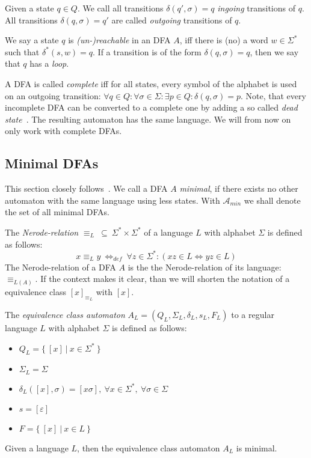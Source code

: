 Given a state $q \in Q$. We call all transitions $\delta(q', \sigma) = q$ \emph{ingoing} transitions of $q$. All transitions $\delta(q, \sigma) = q'$ are called \emph{outgoing} transitions of $q$.

We say a state $q$ is \emph{(un-)reachable} in an DFA $A$, iff there is (no) a word $w \in \Sigma^*$ such that $\delta^*(s, w) = q$. If a transition is of the form $\delta(q, \sigma) = q$, then we say that $q$ has a \emph{loop}.

A DFA is called \emph{complete} iff for all states, every symbol of the alphabet is used on an outgoing transition: $\forall q\in Q\colon \forall\sigma\in\Sigma\colon \exists p\in Q\colon \delta(q,\sigma) = p$. Note, that every incomplete DFA can be converted to a complete one by adding a so called \emph{dead state}~\cite[p. 67]{hopcroft01}. The resulting automaton has the same language. We will from now on only work with complete DFAs.

\subsection{Minimal DFAs}

This section closely follows~\cite[pp. 42-45]{schoening01}. We call a DFA $A$ \emph{minimal}, if there exists no other automaton with the same language using less states. With $\mathcal{A}_{min}$ we shall denote the set of all minimal DFAs.

The \emph{Nerode-relation} $\equiv_L\ \subseteq\ \Sigma^* \times \Sigma^*$ of a language $L$ with alphabet $\Sigma$ is defined as follows:
\begin{displaymath}
	x \equiv_L y\ \Leftrightarrow_{def}\ \forall z\in\Sigma^*\colon (xz\in L \Leftrightarrow yz\in L)
\end{displaymath}
The Nerode-relation of a DFA $A$ is the the Nerode-relation of its language: $\equiv_{L(A)}$. If the context makes it clear, than we will shorten the notation of a equivalence class $[x]_{\equiv_L}$ with $[x]$.

The \emph{equivalence class automaton} $A_L = (Q_L, \Sigma_L, \delta_L, s_L, F_L)$ to a regular language $L$ with alphabet $\Sigma$ is defined as follows:
\begin{itemize}
	\item $Q_L = \{\ [x]\ |\ x \in \Sigma^*\ \}$
	\item $\Sigma_L = \Sigma$
	\item $\delta_L([x], \sigma) = [x\sigma],\ \forall x\in\Sigma^*,\ \forall\sigma\in\Sigma$
	\item $s = [\varepsilon]$
	\item $F = \{\ [x]\ |\ x \in L\ \}$
\end{itemize}
\begin{theorem}
	Given a language $L$, then the equivalence class automaton $A_L$ is minimal.
\end{theorem}

